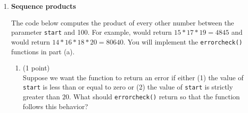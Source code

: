 \documentclass{article}
\newcounter{points}
\newcounter{bonuspoints}
\newcommand\setpoint{\addtocounter{points}{1}(1 point)}
\newcommand\setbonuspoint{\addtocounter{bonuspoints}{1}(1 bonus point)}
\begin{document}
\begin{enumerate}
\begin{enumerate}
\item \setpoint \\

\end{enumerate}

\begin{enumerate}
\setcounter{enumii}{1}
\item \setpoint \\

\end{enumerate}

\begin{enumerate}
\setcounter{enumii}{2}
\item \setpoint \\

\end{enumerate}

\begin{enumerate}
\setcounter{enumii}{3}
\item \setpoint \\

\end{enumerate}

\begin{enumerate}
\setcounter{enumii}{4}
\item \setbonuspoint \\

\end{enumerate}


\item \textbf{Sequence products}

The code below computes the product of every other number between the parameter \texttt{start} and 100.  For example,  would return $15 * 17 * 19 = 4845$ and  would return $14 * 16 * 18 * 20 = 80640$.  You will implement the \texttt{errorcheck()} functions in part (a). \\



\begin{enumerate}
\item \setpoint \\
Suppose we want the function to return an error if either (1) the value of \texttt{start} is less than or equal to zero or (2) the value of \texttt{start} is strictly greater than $20$.  What should \texttt{errorcheck()} return so that the function follows this behavior?
\end{enumerate}


\end{enumerate}
\end{document}
